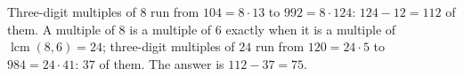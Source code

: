 Three-digit multiples of $8$ run from $104=8\cdot13$ to $992=8\cdot124$: $124-12=112$ of them. A multiple of $8$ is a multiple of $6$ exactly when it is a multiple of $\operatorname{lcm}(8,6)=24$; three-digit multiples of $24$ run from $120=24\cdot5$ to $984=24\cdot41$: $37$ of them. The answer is $112-37=\boxed{75}$.
